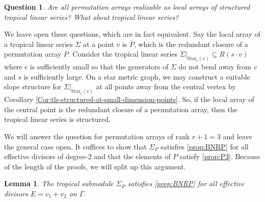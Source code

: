 \documentclass{amsart}
\newtheorem{lemma}[theorem]{Lemma}
\newtheorem{question}[theorem]{Question}
\begin{document}
	\begin{question}
		Are all permutation arrays realizable as local arrays of structured tropical linear series? What about tropical linear series?
	\end{question}
	
	We leave open these questions, which are in fact equivalent. Say the local array of a tropical linear series $\Sigma$ at a point $v$ is $\overline{P}$, which is the redundant closure of a permutation array $P$. Consider the tropical linear series $\Sigma|_{\mathrm{Star}_{\epsilon}(v)} \subseteq R(s \cdot v)$ where $\epsilon$ is sufficiently small so that the generators of $\Sigma$ do not bend away from $v$ and $s$ is sufficiently large. On a star metric graph, we may construct a suitable slope structure for $\Sigma|_{\mathrm{Star}_{\epsilon}(v)}$ at all points away from the central vertex by Corollary \ref{Cor:tls-structured-at-small-dimension-points}. So, if the local array of the central point is the redundant closure of a permutation array, then the tropical linear series is structured. 
	
	We will answer the question for permutation arrays of rank $r+1=3$ and leave the general case open. It suffices to show that $\Sigma_P$ satisfies \ref{prop:BNRP} for all effective divisors of degree-$2$ and that the elements of $P$ satisfy \ref{prop:P3}. Because of the length of the proofs, we will split up this argument.
	
	\begin{lemma}
		\label{Lem:bn-realization-rk2}
		The tropical submodule $\Sigma_P$ satisfies \ref{prop:BNRP} for all effective divisors $E = v_1 + v_2$ on $\Gamma$.
	\end{lemma}
	
\end{document}
